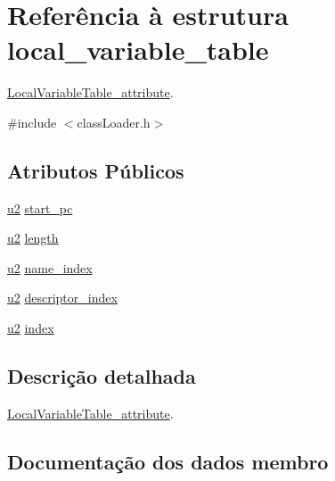 \hypertarget{structlocal__variable__table}{}\section{Referência à estrutura local\+\_\+variable\+\_\+table}
\label{structlocal__variable__table}


\hyperlink{struct_local_variable_table__attribute}{Local\+Variable\+Table\+\_\+attribute}.  




{\ttfamily \#include $<$class\+Loader.\+h$>$}

\subsection*{Atributos Públicos}
\begin{DoxyCompactItemize}
\item 
\hyperlink{util_8h_a55ef8d87fd202b8417704c089899c5b9}{u2} \hyperlink{structlocal__variable__table_aa86e910619df9b3284535529bc887a12}{start\+\_\+pc}
\item 
\hyperlink{util_8h_a55ef8d87fd202b8417704c089899c5b9}{u2} \hyperlink{structlocal__variable__table_a76b778cea6d99b0854cba21e223569cc}{length}
\item 
\hyperlink{util_8h_a55ef8d87fd202b8417704c089899c5b9}{u2} \hyperlink{structlocal__variable__table_a6c91f7b672683a35b1433c429de69069}{name\+\_\+index}
\item 
\hyperlink{util_8h_a55ef8d87fd202b8417704c089899c5b9}{u2} \hyperlink{structlocal__variable__table_adb823a30762d64e9d20f674ae7923bfc}{descriptor\+\_\+index}
\item 
\hyperlink{util_8h_a55ef8d87fd202b8417704c089899c5b9}{u2} \hyperlink{structlocal__variable__table_af13a15b5fbb398323997b88d341a6c38}{index}
\end{DoxyCompactItemize}


\subsection{Descrição detalhada}
\hyperlink{struct_local_variable_table__attribute}{Local\+Variable\+Table\+\_\+attribute}. 

\subsection{Documentação dos dados membro}
\mbox{\label{structlocal__variable__table_adb823a30762d64e9d20f674ae7923bfc}} 
